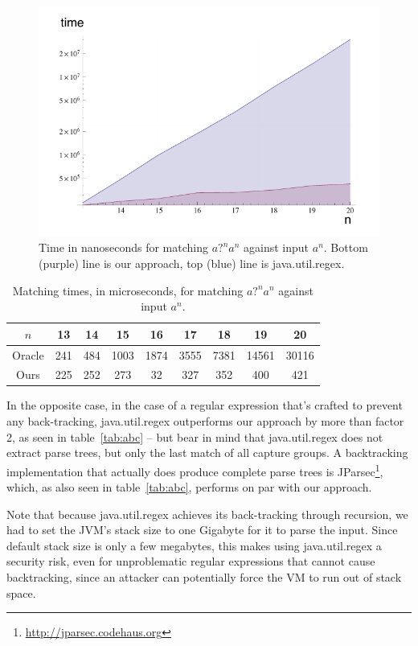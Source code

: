 \documentclass[11pt]{Thesis}
\theoremstyle{definition}
\newcommand{\Tabref}[1]{table~\ref{tab:#1}}
\newcommand{\figlabel}[1]{\label{fig:#1}}
\newcommand{\tablabel}[1]{\label{tab:#1}}
\begin{document}
\begin{figure}[htp]
\includegraphics[width=\linewidth]{graphs/pathological-with-axes.pdf}
\caption{Time in nanoseconds for matching $\textit{a?}^n\textit{a}^n$ against
input $\textit{a}^n$. Bottom (purple) line is our approach, top (blue) line is
java.util.regex.}
\figlabel{patho}
\end{figure}

\begin{table}[htb]\center
\begin{tabular}{ccccccccc}
\toprule
$n$ & 13 & 14 & 15 & 16 & 17 & 18 & 19 & 20\tabularnewline
\midrule
Oracle & 241 & 484 & 1003 & 1874 & 3555 & 7381 & 14561 & 30116\tabularnewline
Ours & 225 & 252 & 273 & 32 & 327 & 352 & 400 & 421\tabularnewline
\bottomrule
\end{tabular}
\caption{Matching times, in microseconds, for matching
  $\textit{a?}^n\textit{a}^n$ against input $\textit{a}^n$.}
\tablabel{patho}
\end{table}

In the opposite case, in the case of a regular expression that's
crafted to prevent any back-tracking, java.util.regex outperforms
our approach by more than factor 2, as seen in \Tabref{abc} -- but
bear in mind that java.util.regex does not extract parse trees, but
only the last match of all capture groups.  A backtracking
implementation that actually does produce complete parse trees is
JParsec\footnote{\url{http://jparsec.codehaus.org}}, which, as also
seen in \Tabref{abc}, performs on par with our approach. 

Note that because java.util.regex achieves its back-tracking through recursion,
we had to set the JVM's stack size to one Gigabyte for it to parse the input.
Since default stack size is only a few megabytes, this makes using
java.util.regex a security risk, even for unproblematic regular expressions
that cannot cause backtracking, since an attacker can potentially force the VM
to run out of stack space.
\end{document}
